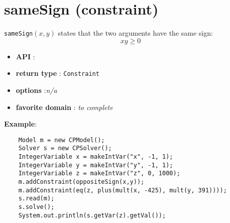 \label{samesign}
\hypertarget{samesign}{}

\section{sameSign (constraint)}\label{samesign:samesignconstraint}\hypertarget{samesign:samesignconstraint}{}

\begin{notedef}
  \texttt{sameSign}$(x,y)$ states that the two arguments have the same sign:
$$xy\ge 0$$
\end{notedef}

\begin{itemize}
	\item \textbf{API} : 
	\item \textbf{return type} : \texttt{Constraint}
	\item \textbf{options} :\emph{n/a}
	\item \textbf{favorite domain} : \emph{to complete}
\end{itemize}

\textbf{Example}:
\begin{lstlisting}
	Model m = new CPModel();
	Solver s = new CPSolver();
	IntegerVariable x = makeIntVar("x", -1, 1);
	IntegerVariable y = makeIntVar("y", -1, 1);
	IntegerVariable z = makeIntVar("z", 0, 1000);
	m.addConstraint(oppositeSign(x,y));
	m.addConstraint(eq(z, plus(mult(x, -425), mult(y, 391))));
	s.read(m);
	s.solve();
	System.out.println(s.getVar(z).getVal());
\end{lstlisting} 
